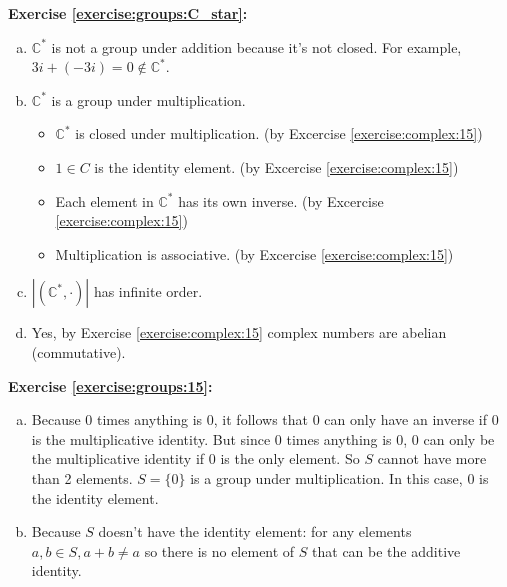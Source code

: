 \noindent\textbf{Exercise \ref{exercise:groups:C_star}:}
\begin{enumerate}[(a)]
\item
${\mathbb C}^{\ast}$ is not a group under addition because it's not closed. For example, 
$3i + (-3i) = 0 \not\in {\mathbb C}^{\ast}$.

\item
${\mathbb C}^{\ast}$ is a group under multiplication.
	
	\begin{itemize}
	\item
	${\mathbb C}^{\ast}$ is closed under multiplication. \quad \quad (by Excercise \ref{exercise:complex:15})

	\item
	$1 \in C$ is the identity element. \quad \quad (by Excercise \ref{exercise:complex:15})

	\item
	Each element in ${\mathbb C}^{\ast}$ has its own inverse. \quad \quad (by Excercise \ref{exercise:complex:15})

	\item
	Multiplication is associative. \quad \quad (by Excercise \ref{exercise:complex:15})
	\end{itemize}
	
\item
$|({\mathbb C}^{\ast}, \cdot)|$ has infinite order.

\item
Yes, by Exercise \ref{exercise:complex:15} complex numbers are abelian (commutative).
\end{enumerate} 

\noindent\textbf{Exercise \ref{exercise:groups:15}:}
\begin{enumerate}[(a)]
\item
Because 0 times anything is 0, it follows that 0 can only have an inverse if 0 is the multiplicative identity. But since 0 times anything is 0, 0 can only be the multiplicative identity if 0 is the only element. So $S$ cannot have more than 2 elements.
 $S = \{0\}$ is a group under multiplication. In this case, $0$ is the identity element.

\item
Because $S$ doesn't have the identity element: for any elements $a,b \in S, a+b \neq a$ so there is no element of $S$ that can be the additive identity.
\end{enumerate}

